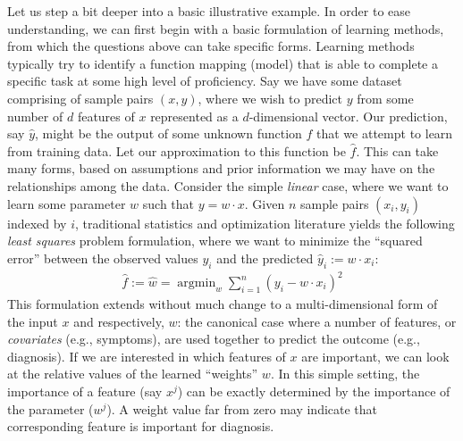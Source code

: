 
Let us step a bit deeper into a basic illustrative example. In order to ease understanding, we can first begin with a basic formulation of learning methods, from which the questions above can take specific forms. 
Learning methods typically  try to identify a function mapping (model) that is able to complete a specific task at some high level of proficiency. 
Say we have some dataset comprising of sample pairs $(x,y)$, where we wish to predict $y$ from some number of $d$ features of $x$ represented as a $d$-dimensional vector.
Our prediction, say $\hat{y}$, might be the output of some unknown function $f$ that we attempt to learn from training data. 
Let our approximation to this function be $\hat{f}$.
This can take many forms, 
based on assumptions and prior information we may have on the relationships among the data. 
Consider the simple \textit{linear} case,
where we want to learn some parameter $w$ such that $y = w\cdot x$. 
Given $n$ sample pairs $(x_i,y_i)$ indexed by $i$, traditional statistics and optimization literature yields the following \textit{least squares} problem formulation, where we want to minimize the ``squared error'' between the observed values $y_i$ and the predicted $\hat{y}_i:= w\cdot x_i$:
\begin{align}\label{eq:lq}
\hat{f}:=\hat{w} = \mathop{\arg\min}_{w} \sum_{i=1}^n (y_i - w\cdot x_i)^2
\end{align}
This formulation extends without much change to a multi-dimensional form of the input $x$ and respectively, $w$: the canonical case where a number of features, or \textit{covariates} (e.g., symptoms), are used together to predict the outcome (e.g., diagnosis). 
If we are interested in which features of $x$ are important, we can look at the relative values of the learned ``weights'' $w$. In this simple setting, the importance of a feature (say $x^j$) can be exactly determined by the importance of the parameter ($w^j$).
A weight value far from zero may indicate that corresponding feature is important for diagnosis.

